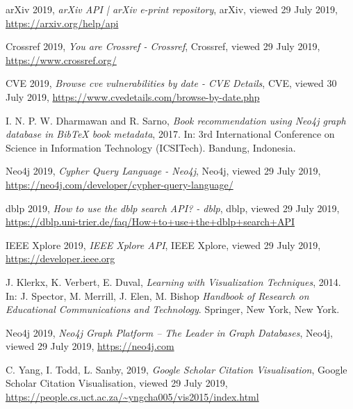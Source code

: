 \documentclass[twocolumn]{article}
\begin{document}
\begin{thebibliography}{9}

arXiv 2019,
\textit{arXiv API | arXiv e-print repository},
arXiv, viewed 29 July 2019,
\url{https://arxiv.org/help/api}

Crossref 2019,
\textit{You are Crossref - Crossref},
Crossref, viewed 29 July 2019,
\url{https://www.crossref.org/}

CVE 2019,
\textit{Browse cve vulnerabilities by date - CVE Details},
CVE, viewed 30 July 2019,
\url{https://www.cvedetails.com/browse-by-date.php}

I. N. P. W. Dharmawan and R. Sarno, 
\textit{Book recommendation using Neo4j graph database in BibTeX book metadata}, 2017.
In: 3rd International Conference on Science in Information Technology (ICSITech). 
Bandung, Indonesia.

Neo4j 2019,
\textit{Cypher Query Language - Neo4j},
Neo4j, viewed 29 July 2019,
\url{https://neo4j.com/developer/cypher-query-language/}

dblp 2019,
\textit{How to use the dblp search API? - dblp},
dblp, viewed 29 July 2019,
\url{https://dblp.uni-trier.de/faq/How+to+use+the+dblp+search+API}

IEEE Xplore 2019,
\textit{IEEE Xplore API},
IEEE Xplore, viewed 29 July 2019,
\url{https://developer.ieee.org}

J. Klerkx, K. Verbert, E. Duval,
\textit{Learning with Visualization Techniques}, 2014.
In: J. Spector, M. Merrill, J. Elen, M. Bishop 
\textit{Handbook of Research on Educational Communications and Technology}. 
Springer, New York, New York.

Neo4j 2019, 
\textit{Neo4j Graph Platform – The Leader in Graph Databases}, 
Neo4j, viewed 29 July 2019, 
\url{https://neo4j.com}

C. Yang, I. Todd, L. Sanby, 2019,
\textit{Google Scholar Citation Visualisation},
Google Scholar Citation Visualisation, viewed 29 July 2019,
\url{https://people.cs.uct.ac.za/~yngcha005/vis2015/index.html}


\end{thebibliography}
\end{document}
